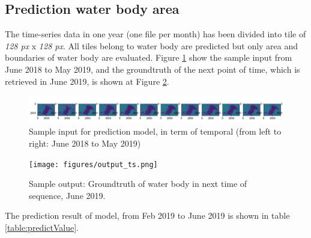 \subsection{Prediction water body area}



The time-series data in one year (one file per month) has been divided into tile of \textit{128 px } x \textit{128 px}. All tiles belong to water body are predicted but only area and boundaries of water body are evaluated. Figure \ref{fig:inputTs} show the sample input from June 2018 to May 2019, and the groundtruth of the next point of time, which is retrieved in June 2019, is shown at Figure \ref{fig:outputTs}.

\begin{figure}[h!]
	\centering
	\includegraphics[width=1\textwidth]{figures/input_ts.png}
	\caption{Sample input for prediction model, in term of temporal (from left to right: June 2018 to May 2019)}
	\label{fig:inputTs}
\end{figure}

\begin{figure}[h!]
	\centering
	\texttt{[image: figures/output\_ts.png]}
	\caption{Sample output: Groundtruth of water body in next time of sequence, June 2019.}
	\label{fig:outputTs}
\end{figure}

The prediction result of model, from Feb 2019 to June 2019 is shown in table \ref{table:predictValue}.



